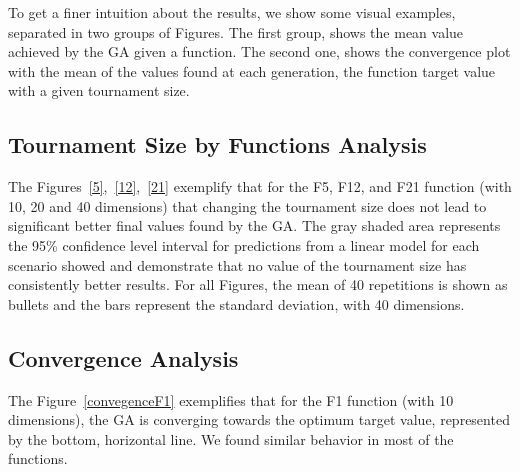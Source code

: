 To get a finer intuition about the results, we show  some visual examples, separated in two groups of Figures. The first group, shows the mean value achieved by the GA given a function. The second one, shows the convergence plot with the mean of the values found at each generation, the function target value with a given tournament size.






\subsection{Tournament Size by Functions Analysis}
The Figures~\ref{5},~\ref{12},~\ref{21} exemplify that for the F5, F12, and F21 function (with 10, 20 and 40 dimensions) that changing the tournament size does not lead to significant better final values found by the GA. The gray shaded area represents the 95\% confidence level interval for predictions from a linear model for each scenario showed and demonstrate that no value of the tournament size has consistently better results. For all Figures, the mean of 40 repetitions is shown as bullets and the bars represent the standard deviation, with 40 dimensions. 



\subsection{Convergence Analysis}
The Figure~\ref{convegenceF1} exemplifies that for the F1 function (with 10 dimensions), the GA is converging towards the optimum target value, represented by the bottom, horizontal line. We found similar behavior in most of the functions.



